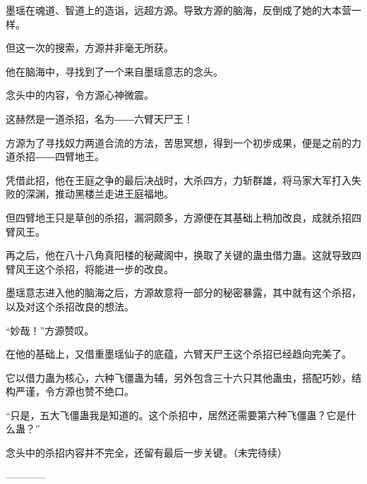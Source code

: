 \begin{this_body}
墨瑶在魂道、智道上的造诣，远超方源。导致方源的脑海，反倒成了她的大本营一样。

但这一次的搜索，方源并非毫无所获。

他在脑海中，寻找到了一个来自墨瑶意志的念头。

念头中的内容，令方源心神微震。

这赫然是一道杀招，名为――六臂天尸王！

方源为了寻找奴力两道合流的方法，苦思冥想，得到一个初步成果，便是之前的力道杀招――四臂地王。

凭借此招，他在王庭之争的最后决战时，大杀四方，力斩群雄，将马家大军打入失败的深渊，推动黑楼兰走进王庭福地。

但四臂地王只是草创的杀招，漏洞颇多，方源便在其基础上稍加改良，成就杀招四臂风王。

再之后，他在八十八角真阳楼的秘藏阁中，换取了关键的蛊虫借力蛊。这就导致四臂风王这个杀招，将能进一步的改良。

墨瑶意志进入他的脑海之后，方源故意将一部分的秘密暴露，其中就有这个杀招，以及对这个杀招改良的想法。

“妙哉！”方源赞叹。

在他的基础上，又借重墨瑶仙子的底蕴，六臂天尸王这个杀招已经趋向完美了。

它以借力蛊为核心，六种飞僵蛊为辅，另外包含三十六只其他蛊虫，搭配巧妙，结构严谨，令方源也赞不绝口。

“只是，五大飞僵蛊我是知道的。这个杀招中，居然还需要第六种飞僵蛊？它是什么蛊？”

念头中的杀招内容并不完全，还留有最后一步关键。（未完待续）

------------

\end{this_body}

